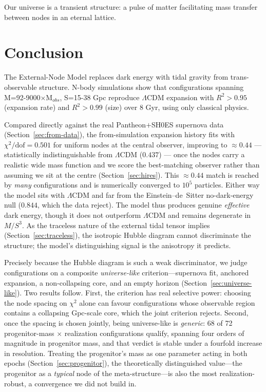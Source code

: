 \documentclass{article}
\begin{document}
Our universe is a transient structure: a pulse of matter facilitating mass transfer between nodes in an eternal lattice.

\section{Conclusion}
\label{sec:conclusion}
The External-Node Model replaces dark energy with tidal gravity from trans-observable structure.
N-body simulations show that configurations spanning M=92-9000$\times$M$_{obs}$, S=15-38 Gpc reproduce $\Lambda$CDM expansion with $R^2 > 0.95$ (expansion rate) and $R^2 > 0.99$ (size) over 8 Gyr, using only classical physics.

Compared directly against the real Pantheon$+$SH0ES supernova data (Section~\ref{sec:from-data}), the from-simulation expansion history fits with $\chi^2/\mathrm{dof} = 0.501$ for uniform nodes at the central observer, improving to $\approx 0.44$ --- statistically indistinguishable from $\Lambda$CDM ($0.437$) --- once the nodes carry a realistic wide mass function and we score the best-matching observer rather than assuming we sit at the centre (Section~\ref{sec:hires}). This $\approx 0.44$ match is reached by \emph{many} configurations and is numerically converged to $10^5$ particles. Either way the model sits with $\Lambda$CDM and far from the Einstein--de~Sitter no-dark-energy null ($0.844$, which the data reject). The model thus produces genuine \emph{effective} dark energy, though it does not outperform $\Lambda$CDM and remains degenerate in $M/S^3$. As the traceless nature of the external tidal tensor implies (Section~\ref{sec:traceless}), the isotropic Hubble diagram cannot discriminate the structure; the model's distinguishing signal is the anisotropy it predicts.

Precisely because the Hubble diagram is such a weak discriminator, we judge configurations on a composite \emph{universe-like} criterion---supernova fit, anchored expansion, a non-collapsing core, and an empty horizon (Section~\ref{sec:universe-like}). Two results follow. First, the criterion has real selective power: choosing the node spacing on $\chi^2$ alone can favour configurations whose observable region contains a collapsing Gpc-scale core, which the joint criterion rejects. Second, once the spacing is chosen jointly, being universe-like is \emph{generic}: 68 of 72 progenitor-mass $\times$ realization configurations qualify, spanning four orders of magnitude in progenitor mass, and that verdict is stable under a fourfold increase in resolution. Treating the progenitor's mass as one parameter acting in both epochs (Section~\ref{sec:progenitor}), the theoretically distinguished value---the progenitor as a \emph{typical} node of the meta-structure---is also the most realization-robust, a convergence we did not build in.
\end{document}
